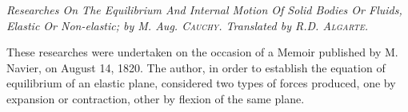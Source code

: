 \documentclass[danish,a4paper,11pt]{scrartcl}
\begin{document}
\begin{center}
\fontsize{11pt}{11pt}
\emph{Researches On The Equilibrium And Internal Motion Of Solid Bodies Or Fluids, Elastic Or Non-elastic; by M. Aug. {\normalfont\scshape Cauchy}. Translated by R.D. {\normalfont\scshape Algarte}.}
\end{center}
\linespread{1.0}
\fontsize{11pt}{11pt}
\normalfont
These researches were undertaken on the occasion of a Memoir published by M. Navier, on August 14, 1820. The author, in order to establish the equation of equilibrium of an elastic plane, considered two types of forces produced, one by expansion or contraction, other by flexion of the same plane. 
\end{document}
